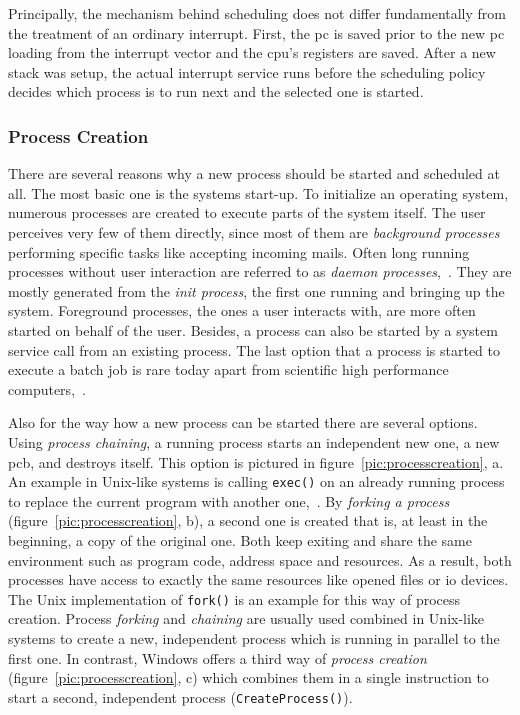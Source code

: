 Principally, the mechanism behind scheduling does not differ fundamentally from the treatment of an ordinary interrupt.
First, the \acf{pc} is saved prior to the new \ac{pc} loading from the interrupt vector and the \ac{cpu}'s registers are saved.
After a new stack was setup, the actual interrupt service runs before the scheduling policy decides which process is to run next and the selected one is started\cite{tanenbaum-modern-operating-systems}.

\subsubsection*{Process Creation}
There are several reasons why a new process should be started and scheduled at all.
The most basic one is the systems start-up.
To initialize an operating system, numerous processes are created to execute parts of the system itself.
The user perceives very few of them directly, since most of them are \textit{background processes} performing specific tasks like accepting incoming mails.
Often long running processes without user interaction are referred to as \textit{daemon processes}\cite{glatz2015betriebssysteme},~\cite{tanenbaum-modern-operating-systems}.
They are mostly generated from the \textit{init process}, the first one running and bringing up the system.
Foreground processes, the ones a user interacts with, are more often started on behalf of the user.
Besides, a process can also be started by a system service call from an existing process.
The last option that a process is started to execute a batch job is rare today apart from scientific high performance computers\cite{tanenbaum-modern-operating-systems},~\cite{glatz2015betriebssysteme}.

Also for the way how a new process can be started there are several options.
Using \textit{process chaining}, a running process starts an independent new one, a new \ac{pcb}, and destroys itself\cite{achilles2006betriebssysteme}.
This option is pictured in figure~\ref{pic:processcreation}, a.
An example in Unix-like systems is calling \texttt{exec()} on an already running process to replace the current program with another one\cite{glatz2015betriebssysteme},~\cite{tanenbaum-modern-operating-systems}.
By \textit{forking a process} (figure~\ref{pic:processcreation}, b), a second one is created that is, at least in the beginning, a copy of the original one.
Both keep exiting and share the same environment such as program code, address space and resources\cite{tanenbaum-modern-operating-systems}.
As a result, both processes have access to exactly the same resources like opened files or \ac{io} devices\cite{achilles2006betriebssysteme}.
The Unix implementation of \texttt{fork()} is an example for this way of process creation.
Process \textit{forking} and \textit{chaining} are usually used combined in Unix-like systems to create a new, independent process which is running in parallel to the first one\cite{tanenbaum-modern-operating-systems}.
In contrast, Windows offers a third way of \textit{process creation} (figure~\ref{pic:processcreation}, c) which combines them in a single instruction to start a second, independent process (\texttt{CreateProcess()})\cite{glatz2015betriebssysteme}.

